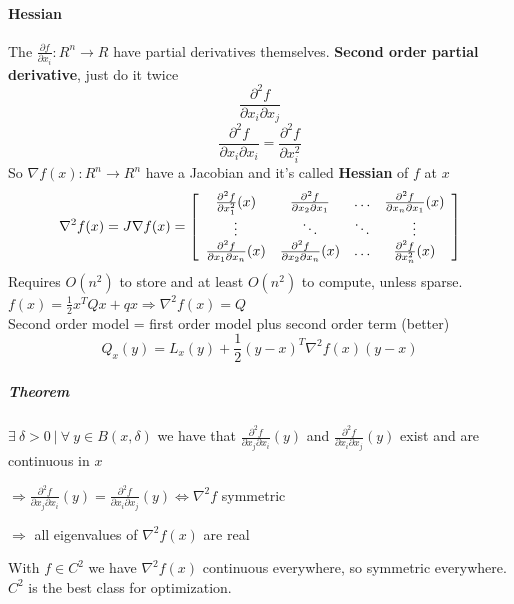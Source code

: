\documentclass[10pt]{report}
\begin{document}
\paragraph{Hessian} The $\frac{\partial f}{\partial x_i}:R^n\rightarrow R$ have partial derivatives themselves. \textbf{Second order partial derivative}, just do it twice $$\frac{\partial^2 f}{\partial x_i \partial x_j}$$ $$\frac{\partial^2 f}{\partial x_i \partial x_i}=\frac{\partial^2 f}{\partial x_i^2}$$
So $\nabla f(x) : R^n \rightarrow R^n$ have a Jacobian and it's called \textbf{Hessian} of $f$ at $x$
$$\nabla^2 f(x) = J\nabla f(x) = \left[ \begin{array}{c c c c}
\frac{\partial^2 f}{\partial x_1^2}(x) & \frac{\partial^2 f}{\partial x_2\partial x_1} & \ldots & \frac{\partial^2 f}{\partial x_n\partial x_1}(x)\\
\vdots&\ddots&\ddots&\vdots\\
\frac{\partial^2 f}{\partial x_1\partial x_n}(x) & \frac{\partial^2 f}{\partial x_2\partial x_n}(x) & \ldots & \frac{\partial^2 f}{\partial x_n^2}(x)\\
\end{array}\right]$$
Requires $O(n^2)$ to store and at least $O(n^2)$ to compute, unless sparse.\\
$f(x) = \frac{1}{2}x^TQx + qx \Rightarrow \nabla^2 f(x) = Q$\\
Second order model = first order model plus second order term (better)
$$Q_x(y) = L_x(y) + \frac{1}{2}(y-x)^T\nabla^2f(x)(y-x)$$
\subparagraph{Theorem} $\exists\:\delta>0\:|\:\forall\:y\in B(x, \delta)$ we have that $\frac{\partial^2 f}{\partial x_j\partial x_i}(y)$ and $\frac{\partial^2 f}{\partial x_i\partial x_j}(y)$ exist and are continuous in $x$\begin{list}{}{}
	\item $\Rightarrow \frac{\partial^2 f}{\partial x_j\partial x_i}(y) = \frac{\partial^2 f}{\partial x_i\partial x_j}(y) \Leftrightarrow \nabla^2 f$ symmetric
	\item $\Rightarrow$ all eigenvalues of $\nabla^2 f(x)$ are real
\end{list}
With $f\in C^2$ we have $\nabla^2 f(x)$ continuous everywhere, so symmetric everywhere. $C^2$ is the best class for optimization.
\end{document}
